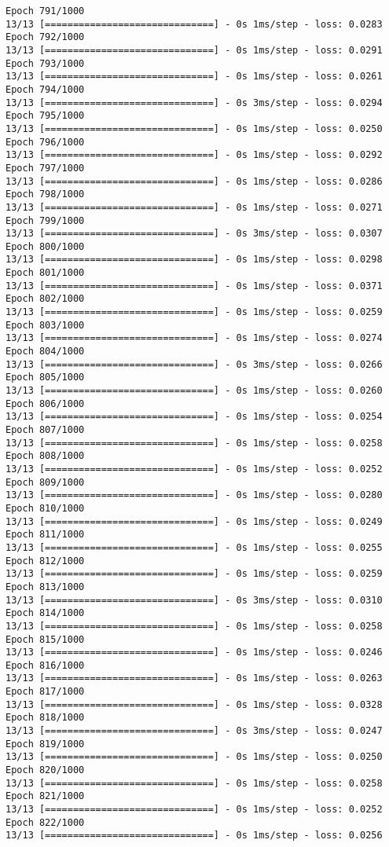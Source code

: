 \documentclass[11pt]{article}
\begin{document}
\begin{Verbatim}[commandchars=\\\{\}]
Epoch 791/1000
13/13 [==============================] - 0s 1ms/step - loss: 0.0283
Epoch 792/1000
13/13 [==============================] - 0s 1ms/step - loss: 0.0291
Epoch 793/1000
13/13 [==============================] - 0s 1ms/step - loss: 0.0261
Epoch 794/1000
13/13 [==============================] - 0s 3ms/step - loss: 0.0294
Epoch 795/1000
13/13 [==============================] - 0s 1ms/step - loss: 0.0250
Epoch 796/1000
13/13 [==============================] - 0s 1ms/step - loss: 0.0292
Epoch 797/1000
13/13 [==============================] - 0s 1ms/step - loss: 0.0286
Epoch 798/1000
13/13 [==============================] - 0s 1ms/step - loss: 0.0271
Epoch 799/1000
13/13 [==============================] - 0s 3ms/step - loss: 0.0307
Epoch 800/1000
13/13 [==============================] - 0s 1ms/step - loss: 0.0298
Epoch 801/1000
13/13 [==============================] - 0s 1ms/step - loss: 0.0371
Epoch 802/1000
13/13 [==============================] - 0s 1ms/step - loss: 0.0259
Epoch 803/1000
13/13 [==============================] - 0s 1ms/step - loss: 0.0274
Epoch 804/1000
13/13 [==============================] - 0s 3ms/step - loss: 0.0266
Epoch 805/1000
13/13 [==============================] - 0s 1ms/step - loss: 0.0260
Epoch 806/1000
13/13 [==============================] - 0s 1ms/step - loss: 0.0254
Epoch 807/1000
13/13 [==============================] - 0s 1ms/step - loss: 0.0258
Epoch 808/1000
13/13 [==============================] - 0s 1ms/step - loss: 0.0252
Epoch 809/1000
13/13 [==============================] - 0s 1ms/step - loss: 0.0280
Epoch 810/1000
13/13 [==============================] - 0s 1ms/step - loss: 0.0249
Epoch 811/1000
13/13 [==============================] - 0s 1ms/step - loss: 0.0255
Epoch 812/1000
13/13 [==============================] - 0s 1ms/step - loss: 0.0259
Epoch 813/1000
13/13 [==============================] - 0s 3ms/step - loss: 0.0310
Epoch 814/1000
13/13 [==============================] - 0s 1ms/step - loss: 0.0258
Epoch 815/1000
13/13 [==============================] - 0s 1ms/step - loss: 0.0246
Epoch 816/1000
13/13 [==============================] - 0s 1ms/step - loss: 0.0263
Epoch 817/1000
13/13 [==============================] - 0s 1ms/step - loss: 0.0328
Epoch 818/1000
13/13 [==============================] - 0s 3ms/step - loss: 0.0247
Epoch 819/1000
13/13 [==============================] - 0s 1ms/step - loss: 0.0250
Epoch 820/1000
13/13 [==============================] - 0s 1ms/step - loss: 0.0258
Epoch 821/1000
13/13 [==============================] - 0s 1ms/step - loss: 0.0252
Epoch 822/1000
13/13 [==============================] - 0s 1ms/step - loss: 0.0256

\end{Verbatim}
\end{document}
